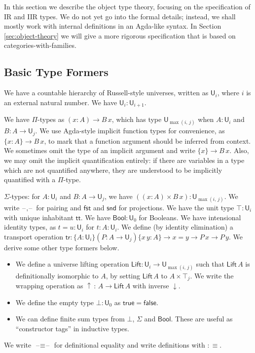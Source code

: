 \documentclass[acmsmall,screen,review,anonymous]{acmart}
\newcommand{\msf}[1]{{\mathsf{#1}}}
\newcommand{\U}{\msf{U}}
\newcommand{\Lift}{\msf{Lift}}
\newcommand{\lup}{\uparrow}
\newcommand{\ldown}{\downarrow}
\newcommand{\ttt}{\msf{tt}}
\newcommand{\blank}{{\mathord{\hspace{1pt}\text{--}\hspace{1pt}}}}
\newcommand{\tr}{\msf{tr}}
\newcommand{\fst}{\msf{fst}}
\newcommand{\snd}{\msf{snd}}
\newcommand{\Bool}{\msf{Bool}}
\newcommand{\true}{\msf{true}}
\newcommand{\false}{\msf{false}}
\begin{document}
In this section we describe the object type theory, focusing on the specification of IR and IIR
types. We do not yet go into the formal details; instead, we shall mostly work with internal
definitions in an Agda-like syntax. In Section \ref{sec:object-theory} we will give a more rigorous
specification that is based on categories-with-families.

\subsection{Basic Type Formers}\label{sec:basic-type-formers}
We have a countable hierarchy of Russell-style universes, written as $\U_i$, where $i$ is an
external natural number. We have $\U_i : \U_{i + 1}$.

We have $\Pi$-types as $(x : A) \to B\,x$, which has type $\U_{\max(i,\,j)}$ when $A : \U_i$ and $B
: A \to \U_j$. We use Agda-style implicit function types for convenience, as $\{x : A\} \to B\,x$,
to mark that a function argument should be inferred from context. We sometimes omit the type of an
implicit argument and write $\{x\} \to B\,x$.  Also, we may omit the implicit quantification
entirely: if there are variables in a type which are not quantified anywhere, they are understood
to be implicitly quantified with a $\Pi$-type.

$\Sigma$-types: for $A : \U_i$ and $B : A \to \U_j$, we have $((x : A) \times B\,x) :
\U_{\max(i,\,j)}$.  We write $\blank,\blank$ for pairing and $\fst$ and $\snd$ for projections. We
have the unit type $\top : \U_i$ with unique inhabitant $\ttt$. We have $\Bool : \U_0$ for
Booleans. We have intensional identity types, as $t = u : \U_i$ for $t : A : \U_i$. We define (by
identity elimination) a transport operation $\tr : \{A : \U_i\}(P : A \to \U_j)\{x\,y : A\} \to x =
y \to P\,x \to P\,y$. We derive some other type formers below.
\begin{itemize}
  \item We define a universe lifting operation $\Lift : \U_i \to \U_{\max(i,\,j)}$ such that
    $\Lift\,A$ is definitionally isomorphic to $A$, by setting $\Lift\,A$ to $A \times \top_j$. We
    write the wrapping operation as $\lup\,:\,A \to \Lift\,A$ with inverse $\ldown$.
  \item We define the empty type $\bot : \U_0$ as $\true = \false$.
  \item We can define finite sum types from $\bot$, $\Sigma$ and $\Bool$. These are useful
    as ``constructor tags'' in inductive types.
\end{itemize}
We write $\blank\!\!\equiv\!\!\blank$ for definitional equality and write definitions with $:\equiv$.
\end{document}
